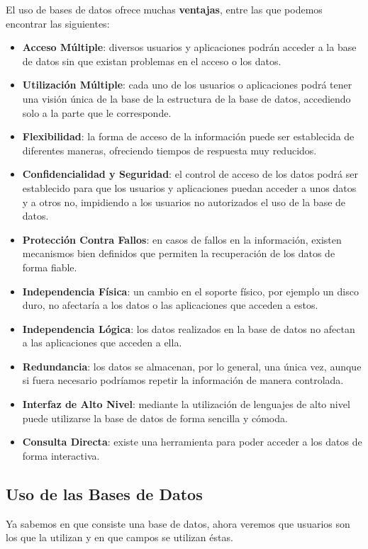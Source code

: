 El uso de bases de datos ofrece muchas \textbf{ventajas}, entre las que podemos encontrar las siguientes:

\begin{itemize}
    \item \textbf{Acceso Múltiple}: diversos usuarios y aplicaciones podrán acceder a la base de datos sin que existan problemas en el acceso o los datos.
    \item \textbf{Utilización Múltiple}: cada uno de los usuarios o aplicaciones podrá tener una visión única de la base de la estructura de la base de datos, accediendo solo a la parte que le corresponde.
    \item \textbf{Flexibilidad}: la forma de acceso de la información puede ser establecida de diferentes maneras, ofreciendo tiempos de respuesta muy reducidos.
    \item \textbf{Confidencialidad y Seguridad}: el control de acceso de los datos podrá ser establecido para que los usuarios y aplicaciones puedan acceder a unos datos y a otros no, impidiendo a los usuarios no autorizados el uso de la base de datos.
    \item \textbf{Protección Contra Fallos}: en casos de fallos en la información, existen mecanismos bien definidos que permiten la recuperación de los datos de forma fiable.
    \item \textbf{Independencia Física}: un cambio en el soporte físico, por ejemplo un disco duro, no afectaría a los datos o las aplicaciones que acceden a estos.
    \item \textbf{Independencia Lógica}: los datos realizados en la base de datos no afectan a las aplicaciones que acceden a ella.
    \item \textbf{Redundancia}: los datos se almacenan, por lo general, una única vez, aunque si fuera necesario podríamos repetir la información de manera controlada.
    \item \textbf{Interfaz de Alto Nivel}: mediante la utilización de lenguajes de alto nivel puede utilizarse la base de datos de forma sencilla y cómoda.
    \item \textbf{Consulta Directa}: existe una herramienta para poder acceder a los datos de forma interactiva.
\end{itemize}

\subsection{Uso de las Bases de Datos}
Ya sabemos en que consiste una base de datos, ahora veremos que usuarios son los que la utilizan y en que campos se utilizan éstas.

